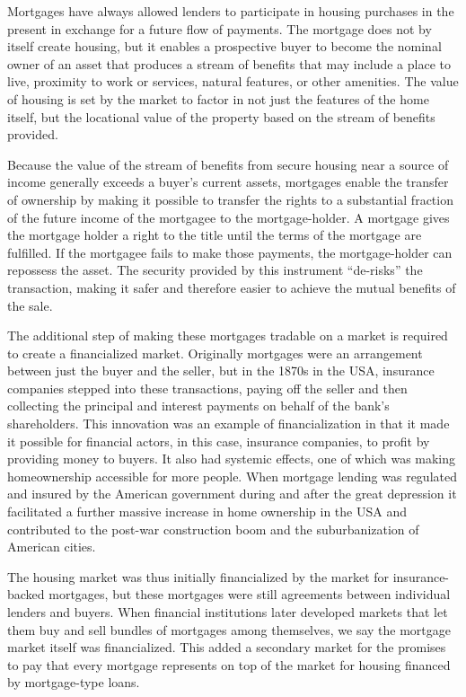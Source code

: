 Mortgages have always allowed lenders to participate in housing purchases in the present in exchange for a future flow of payments. The mortgage does not by itself create housing, but it enables a prospective buyer to become the nominal owner of an asset that produces a stream of benefits that may include a place to live, proximity to work or services, natural features, or other amenities. The value of housing is set by the market to factor in not just the features of the home itself, but the locational value of the property based on the stream of benefits provided. 

Because the value of the stream of benefits from secure housing near a source of income generally exceeds a buyer's current assets, mortgages enable the transfer of ownership by making it possible to transfer the rights to a substantial fraction of the future income of the mortgagee to the mortgage-holder. A mortgage gives the mortgage holder a right to the title until the terms of the mortgage are fulfilled.  If the mortgagee fails to make those payments, the mortgage-holder can repossess the asset. The security provided by this instrument ``de-risks'' the transaction, making it safer and therefore easier to achieve the mutual benefits of the sale. 

The additional step of making these mortgages tradable on a market is required to create a financialized market. Originally mortgages were an arrangement between just the buyer and the seller, but in the 1870s in the USA, insurance companies stepped into these transactions, paying off the seller and then collecting the principal and interest payments on behalf of the bank's shareholders. This innovation was an example of financialization in that it made it possible for financial actors, in this case,  insurance companies, to profit by providing money to buyers. It also had systemic effects, one of which was making homeownership accessible for more people. When mortgage lending was regulated and insured by the American government during and after the great depression it facilitated a further massive increase in home ownership in the USA and contributed to the post-war construction boom and the suburbanization of American cities. 

The housing market was thus initially financialized by the market for insurance-backed mortgages, but these mortgages were still agreements between individual lenders and buyers. When financial institutions later developed markets that let them buy and sell bundles of mortgages among themselves, we say the mortgage market itself was financialized. This added %
a secondary market for the promises to pay that every mortgage represents on top of the market for housing financed by mortgage-type loans.
%

